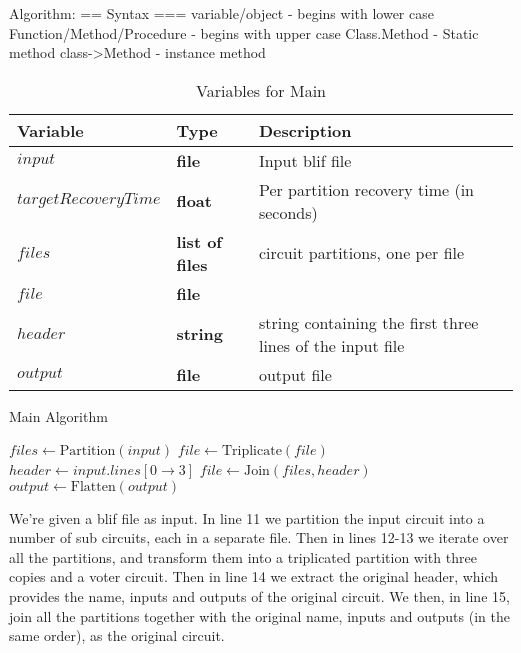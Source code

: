 \documentclass[12pt,draft,oneside]{article} %
\begin{document}
Algorithm:
==
Syntax
===
variable/object - begins with lower case
Function/Method/Procedure - begins with upper case
Class.Method - Static method
class->Method - instance method
\begin{table}
    \begin{center}
        \begin{tabular}{lll}
        \toprule
        Variable & Type & Description\\
        \midrule
        $input$ & \bf{file} & Input blif file\\
        $targetRecoveryTime$ & \bf{float} & Per partition recovery time (in seconds) \\
        $files$ & \bf{list} of \bf{file}s & circuit partitions, one per file \\
        $file$ & \bf{file} & \\
        $header$ & \bf{string} & string containing the first three lines of the input file \\
        $output$ & \bf{file} & output file\\
        \bottomrule
        \end{tabular}
        \caption{Variables for Main}
        \label{varMain}
    \end{center}
\end{table}
\begin{algorithm}
   \caption{Main Algorithm}\label{main}
   \begin{algorithmic}[1]
         \State $files \gets \mbox{Partition}(input)$
            \State $file \gets \mbox{Triplicate}(file)$
         \EndFor
         \State $header \gets input.lines[0\to 3]$
         \State $file \gets \mbox{Join}(files, header)$
         \State $output \gets \mbox{Flatten}(output)$
      \EndProcedure
   \end{algorithmic}
\end{algorithm}
We're given a blif file as input.
In line 11 we partition the input circuit into a number of sub circuits, each in a separate file.
Then in lines 12-13 we iterate over all the partitions, and transform them into a triplicated partition with three copies and a voter circuit.
Then in line 14 we extract the original header, which provides the name, inputs and outputs of the original circuit.
We then, in line 15, join all the partitions together with the original name, inputs and outputs (in the same order), as the original circuit.
\end{document}

